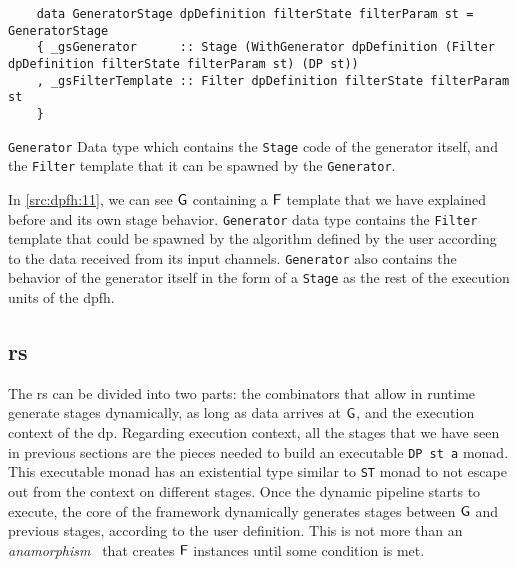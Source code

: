 \begin{listing}[htp!]
  \begin{verbatim}
    data GeneratorStage dpDefinition filterState filterParam st = GeneratorStage
    { _gsGenerator      :: Stage (WithGenerator dpDefinition (Filter dpDefinition filterState filterParam st) (DP st))
    , _gsFilterTemplate :: Filter dpDefinition filterState filterParam st
    }  
  \end{verbatim}
  \caption[{[\texttt{Stage.hs}] Generator}]{\texttt{Generator} Data type which contains the \texttt{Stage} code of the generator itself, and the \texttt{Filter} template that it can be spawned by the \texttt{Generator}.}
  \label{src:dpfh:11}
\end{listing}

In \autoref{src:dpfh:11}, we can see $\mathsf{G}$ containing a $\mathsf{F}$ template that we have explained before and its own stage behavior.
\texttt{Generator} data type contains the \texttt{Filter} template that could be spawned by the algorithm defined by the user according to the data received from its input channels.
\texttt{Generator} also contains the behavior of the generator itself in the form of a \texttt{Stage} as the rest of the execution units of the \acrshort{dpfh}. 

\subsection{\acrfull{rs}}
The \acrshort{rs} can be divided into two parts: the combinators that allow in runtime generate stages dynamically, as long as data arrives at $\mathsf{G}$,
and the execution context of the \acrshort{dp}.
Regarding execution context, all the stages that we have seen in previous sections are the pieces needed to build an executable \texttt{DP st a} monad.
This executable monad has an existential type similar to \texttt{ST} monad to not escape out from the context on different stages.
Once the dynamic pipeline starts to execute, the core of the framework dynamically generates stages between $\mathsf{G}$ and previous stages, according to the user definition. 
This is not more than an \emph{anamorphism}~\cite{lenses} that creates $\mathsf{F}$ instances until some condition is met.

